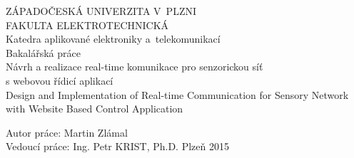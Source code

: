 \documentclass[oneside,12pt,a4paper,draft]{book} %
\begin{document}
\pagestyle{empty}
\begin{titlepage}
\noindent
\begin{center}
	{\LARGE ZÁPADOČESKÁ UNIVERZITA V~PLZNI} \\[0.1cm]
	{\LARGE FAKULTA ELEKTROTECHNICKÁ} \\[0.4cm]
	{\Large\sc Katedra aplikované elektroniky a~telekomunikací} \\
	\vspace{5cm}
	{\Huge\sc Bakalářská práce} \\
	\vspace{1cm}
	{\large Návrh a realizace real-time komunikace pro senzorickou síť\\s webovou řídicí aplikací\\}
	\vspace{1cm}
	{\large Design and Implementation of Real-time Communication for Sensory Network with Website Based Control Application}
\end{center}
\vfill
Autor práce: Martin Zlámal\\
Vedoucí práce: Ing. Petr KRIST, Ph.D. \hfill Plzeň 2015
\end{titlepage}

\pagestyle{plain}







\tableofcontents
\cleardoublepage
{}
{}
\listoffigures
\end{document}
